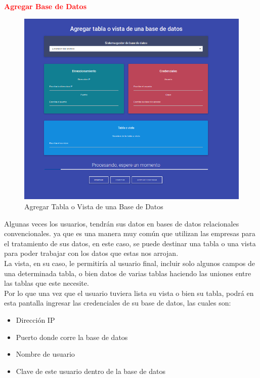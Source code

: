 \textbf{\textcolor{red}{Agregar Base de Datos}}
\begin{figure}[H]
	\hypertarget{fig:red}{\hspace{1pt}}
	\begin{center}
		\includegraphics[width=1.1\textwidth]{capitulo7/images/basededatos.png}
		\caption{Agregar Tabla o Vista de una Base de Datos}
		\label{fig:Tabla}
	\end{center}
\end{figure}
Algunas veces los usuarios, tendrán sus datos en bases de datos relacionales convencionales. ya que es una manera muy común que utilizan las empresas para el tratamiento de sus datos, en este caso, se puede destinar una tabla o una vista para poder trabajar con los datos que estas nos arrojan.\\
La vista, en su caso, le permitiría al usuario final, incluir solo algunos campos de una determinada tabla, o bien datos de varias tablas haciendo las uniones entre las tablas que este necesite. \\
Por lo que una vez que el usuario tuviera lista su vista o bien su tabla, podrá en esta pantalla ingresar las credenciales de su base de datos, las cuales son:
\begin{itemize}
	\item Dirección IP
	\item Puerto donde corre la base de datos
	\item Nombre de usuario
	\item Clave de este usuario dentro de la base de datos 
\end{itemize} 
